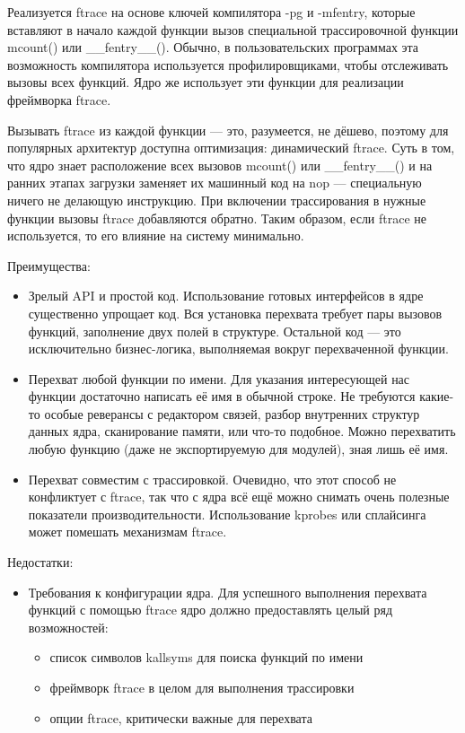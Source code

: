 \documentclass[a4paper,14pt]{extarticle}
\begin{document}
 	Реализуется ftrace на основе ключей компилятора -pg и -mfentry, которые вставляют в начало каждой функции вызов специальной трассировочной функции mcount() или \_\_fentry\_\_(). Обычно, в пользовательских программах эта возможность компилятора используется профилировщиками, чтобы отслеживать вызовы всех функций. Ядро же использует эти функции для реализации фреймворка ftrace.
 	
 	Вызывать ftrace из каждой функции — это, разумеется, не дёшево, поэтому для популярных архитектур доступна оптимизация: динамический ftrace. Суть в том, что ядро знает расположение всех вызовов mcount() или \_\_fentry\_\_() и на ранних этапах загрузки заменяет их машинный код на nop — специальную ничего не делающую инструкцию. При включении трассирования в нужные функции вызовы ftrace добавляются обратно. Таким образом, если ftrace не используется, то его влияние на систему минимально.
 	
 	Преимущества:
 	\begin{itemize}
 		\item Зрелый API и простой код. Использование готовых интерфейсов в ядре существенно упрощает код. Вся установка перехвата требует пары вызовов функций, заполнение двух полей в структуре. Остальной код — это исключительно бизнес-логика, выполняемая вокруг перехваченной функции.
 		\item Перехват любой функции по имени. Для указания интересующей нас функции достаточно написать её имя в обычной строке. Не требуются какие-то особые реверансы с редактором связей, разбор внутренних структур данных ядра, сканирование памяти, или что-то подобное. Можно перехватить любую функцию (даже не экспортируемую для модулей), зная лишь её имя.
 		\item Перехват совместим с трассировкой. Очевидно, что этот способ не конфликтует с ftrace, так что с ядра всё ещё можно снимать очень полезные показатели производительности. Использование kprobes или сплайсинга может помешать механизмам ftrace.
 	\end{itemize}
 	
 	Недостатки:
 	\begin{itemize}
 		\item Требования к конфигурации ядра. Для успешного выполнения перехвата функций с помощью ftrace ядро должно предоставлять целый ряд возможностей:
 		\begin{itemize}
 			\item список символов kallsyms для поиска функций по имени
 			\item фреймворк ftrace в целом для выполнения трассировки
 			\item опции ftrace, критически важные для перехвата
 		\end{itemize}
 	\end{itemize}
 	
\end{document}
